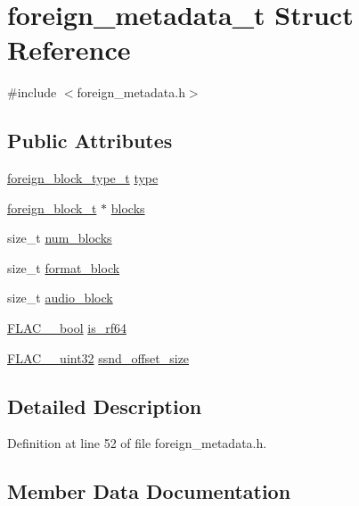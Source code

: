 \hypertarget{structforeign__metadata__t}{}\section{foreign\+\_\+metadata\+\_\+t Struct Reference}
\label{structforeign__metadata__t}


{\ttfamily \#include $<$foreign\+\_\+metadata.\+h$>$}

\subsection*{Public Attributes}
\begin{DoxyCompactItemize}
\item 
\hyperlink{foreign__metadata_8h_adb95c116a179be8763314fa28beca587}{foreign\+\_\+block\+\_\+type\+\_\+t} \hyperlink{structforeign__metadata__t_a580272758c516f16a07dd15fc754ec3e}{type}
\item 
\hyperlink{structforeign__block__t}{foreign\+\_\+block\+\_\+t} $\ast$ \hyperlink{structforeign__metadata__t_a07ffebed0bd84bda92cc9bde6b2216fd}{blocks}
\item 
size\+\_\+t \hyperlink{structforeign__metadata__t_a6854978c03874ceb004b3e88959b8018}{num\+\_\+blocks}
\item 
size\+\_\+t \hyperlink{structforeign__metadata__t_a33ea5938474710ede5dbc6764304bc3b}{format\+\_\+block}
\item 
size\+\_\+t \hyperlink{structforeign__metadata__t_a2227965751ca2a45da38db2815e83ce0}{audio\+\_\+block}
\item 
\hyperlink{ordinals_8h_a95103469f1cbd78b8cf250194985b34e}{F\+L\+A\+C\+\_\+\+\_\+bool} \hyperlink{structforeign__metadata__t_a0bfa5e2f3369a58dec8df6cf67ccf593}{is\+\_\+rf64}
\item 
\hyperlink{ordinals_8h_a9c4005ea7ef8d564b0cc993cdd0e4e5e}{F\+L\+A\+C\+\_\+\+\_\+uint32} \hyperlink{structforeign__metadata__t_a3ac3ad5aa6de385e40fd26a6d50a9480}{ssnd\+\_\+offset\+\_\+size}
\end{DoxyCompactItemize}


\subsection{Detailed Description}


Definition at line 52 of file foreign\+\_\+metadata.\+h.



\subsection{Member Data Documentation}
